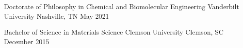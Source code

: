 
\begin{cventries}
    \cventry
    {Doctorate of Philosophy in Chemical and Biomolecular Engineering} %
    {Vanderbilt University} %
    {Nashville, TN} %
    {May 2021} %
    {}

    \cventry
    {Bachelor of Science in Materials Science} %
    {Clemson University} %
    {Clemson, SC} %
    {December 2015} %
    {}
\end{cventries}
